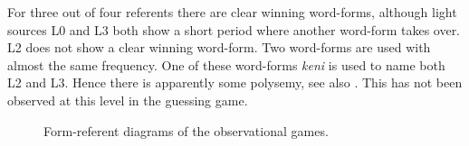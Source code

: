 For three out of four referents there are clear winning word-forms, although light sources L0 and L3 both show a short period where another word-form takes over. L2 does not show a clear winning word-form. Two word-forms are used with almost the same frequency. One of these word-forms {\it keni} is used to name both L2 and L3. Hence there is apparently some polysemy, see also . This has not been observed at this level in the guessing game.

\begin{figure}[t]
\centering
{}
\caption{Form-referent diagrams of the observational games.}
\label{f:opt:froli}
\end{figure}



